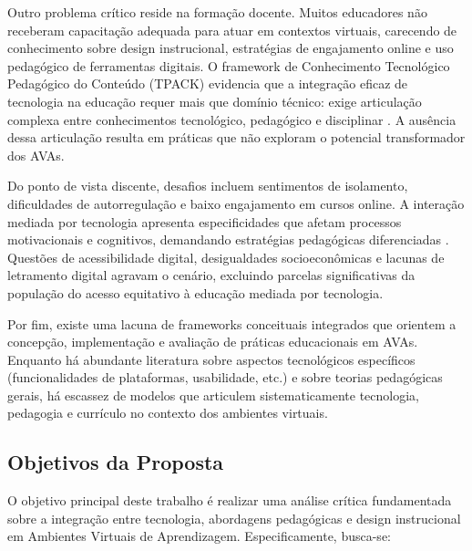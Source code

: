 \documentclass[portuguese]{sbc2025}%
\begin{document}
Outro problema crítico reside na formação docente. Muitos educadores não receberam capacitação adequada para atuar em contextos virtuais, carecendo de conhecimento sobre design instrucional, estratégias de engajamento online e uso pedagógico de ferramentas digitais. O framework de Conhecimento Tecnológico Pedagógico do Conteúdo (TPACK) evidencia que a integração eficaz de tecnologia na educação requer mais que domínio técnico: exige articulação complexa entre conhecimentos tecnológico, pedagógico e disciplinar \cite{Mishra2006, Koehler2009}. A ausência dessa articulação resulta em práticas que não exploram o potencial transformador dos AVAs.

Do ponto de vista discente, desafios incluem sentimentos de isolamento, dificuldades de autorregulação e baixo engajamento em cursos online. A interação mediada por tecnologia apresenta especificidades que afetam processos motivacionais e cognitivos, demandando estratégias pedagógicas diferenciadas \cite{Anderson2003, Garrison2016}. Questões de acessibilidade digital, desigualdades socioeconômicas e lacunas de letramento digital agravam o cenário, excluindo parcelas significativas da população do acesso equitativo à educação mediada por tecnologia.

Por fim, existe uma lacuna de frameworks conceituais integrados que orientem a concepção, implementação e avaliação de práticas educacionais em AVAs. Enquanto há abundante literatura sobre aspectos tecnológicos específicos (funcionalidades de plataformas, usabilidade, etc.) e sobre teorias pedagógicas gerais, há escassez de modelos que articulem sistematicamente tecnologia, pedagogia e currículo no contexto dos ambientes virtuais.

\subsection{Objetivos da Proposta}

O objetivo principal deste trabalho é realizar uma análise crítica fundamentada sobre a integração entre tecnologia, abordagens pedagógicas e design instrucional em Ambientes Virtuais de Aprendizagem. Especificamente, busca-se:
\end{document}
